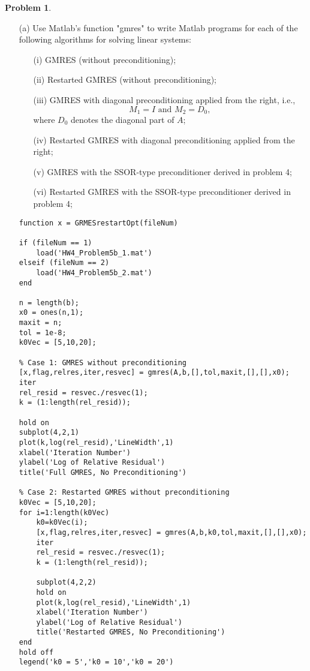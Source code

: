 \documentclass[12pt]{article}
\newtheorem{problem}{Problem}
\begin{document}
\noindent
\begin{problem}
\end{problem}
\begin{itemize}
\item[(a)] Use Matlab's function "gmres" to write Matlab programs for each of the following algorithms for solving linear systems:
\begin{itemize}
\item[(i)] GMRES (without preconditioning);
\item[(ii)] Restarted GMRES (without preconditioning);
\item[(iii)] GMRES with diagonal preconditioning applied from the right, i.e.,
$$M_1 = I \text{ and } M_2 = D_0,$$
where $D_0$ denotes the diagonal part of $A$;
\item[(iv)] Restarted GMRES with diagonal preconditioning applied from the right;
\item[(v)] GMRES with the SSOR-type preconditioner derived in problem 4;
\item[(vi)] Restarted GMRES with the SSOR-type preconditioner derived in problem 4;\\
\end{itemize}

\newpage
\lstset{language=matlab,frame=single}
\begin{lstlisting}[caption=Function to Run Full and Restarted GMRES with Preconditioning Option]
function x = GRMESrestartOpt(fileNum)

if (fileNum == 1)
    load('HW4_Problem5b_1.mat')
elseif (fileNum == 2)
    load('HW4_Problem5b_2.mat')
end

n = length(b);
x0 = ones(n,1);
maxit = n;
tol = 1e-8;
k0Vec = [5,10,20];

% Case 1: GMRES without preconditioning
[x,flag,relres,iter,resvec] = gmres(A,b,[],tol,maxit,[],[],x0);
iter
rel_resid = resvec./resvec(1);
k = (1:length(rel_resid));

hold on
subplot(4,2,1)
plot(k,log(rel_resid),'LineWidth',1)
xlabel('Iteration Number')
ylabel('Log of Relative Residual')
title('Full GMRES, No Preconditioning')

% Case 2: Restarted GMRES without preconditioning
k0Vec = [5,10,20];
for i=1:length(k0Vec)
    k0=k0Vec(i);
    [x,flag,relres,iter,resvec] = gmres(A,b,k0,tol,maxit,[],[],x0);
    iter
    rel_resid = resvec./resvec(1);
    k = (1:length(rel_resid));

    subplot(4,2,2)
    hold on
    plot(k,log(rel_resid),'LineWidth',1)
    xlabel('Iteration Number')
    ylabel('Log of Relative Residual')
    title('Restarted GMRES, No Preconditioning')
end
hold off
legend('k0 = 5','k0 = 10','k0 = 20')


\end{lstlisting}
\end{itemize}
\end{document}
